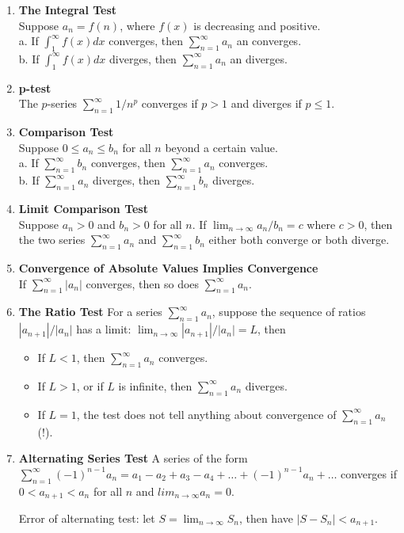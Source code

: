 \documentclass[12pt]{article}
\theoremstyle{definition}
\theoremstyle{definition}
\theoremstyle{remark}
\theoremstyle{definition}
\theoremstyle{definition}
\theoremstyle{definition}
\begin{document}
\begin{enumerate}
\item \textbf{The Integral Test}\\
Suppose $a_n = f(n)$, where $f(x)$ is decreasing and positive.
\\a. If $\int_1^\infty f(x) dx$ converges, then $\sum_{n=1}^{\infty} a_n$ an converges.
\\b. If $\int_1^\infty f(x) dx$ diverges, then $\sum_{n=1}^{\infty} a_n$ an diverges.

\item \textbf{p-test}\\
The $p$-series $\sum_{n=1}^{\infty} 1/n^p$ converges if $p > 1$ and diverges if $p \leq 1$.

\item \textbf{Comparison Test}\\
Suppose $0 \leq a_n \leq b_n$ for all $n$ beyond a certain value.
\\ a. If $\sum_{n=1}^{\infty} b_n$ converges, then $\sum_{n=1}^{\infty} a_n$ converges.
\\ b. If $\sum_{n=1}^{\infty} a_n$ diverges, then $\sum_{n=1}^{\infty} b_n$ diverges.

\item \textbf{Limit Comparison Test}\\
Suppose $a_n > 0$ and $b_n > 0$ for all $n$. If
$\lim_{n\to \infty}a_n/b_n= c$ where $c > 0$,
then the two series $\sum_{n=1}^{\infty} a_n$ and $\sum_{n=1}^{\infty} b_n$ either both converge or both diverge.

\item \textbf{Convergence of Absolute Values Implies Convergence}\\
If $\sum_{n=1}^{\infty}|a_n|$ converges, then so does $\sum_{n=1}^{\infty} a_n$.

\item \textbf{The Ratio Test}
For a series $\sum_{n=1}^{\infty} a_n$, suppose the sequence of ratios $|a_{n+1}|/|a_n|$ has a limit:
$\lim_{n\to \infty}|a_{n+1}|/|a_n| = L$, then
\begin{itemize}
\item If $L < 1$, then $\sum_{n=1}^{\infty} a_n$ converges.
\item If $L > 1$, or if $L$ is infinite, then $\sum_{n=1}^{\infty} a_n$ diverges.
\item If $L = 1$, the test does not tell anything about convergence of $\sum_{n=1}^{\infty} a_n$ (!).
\end{itemize}

\item \textbf{Alternating Series Test}
A series of the form $\sum_{n=1}^{\infty} (-1)^{n-1}a_n = a_1 - a_2 + a_3 - a_4 + \ldots + (-1)^{n-1}a_n + \ldots$
converges if
$0 < a_{n+1} < a_n$ for all $n$ and $lim_{n \to \infty}a_n = 0$.

Error of alternating test: let $S = \lim_{n\to \infty}S_n$, then have $|S - S_n| < a_{n+1}$.
\end{enumerate}
\end{document}

